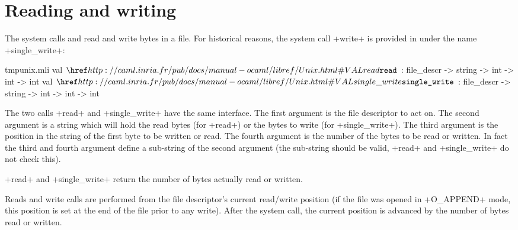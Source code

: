 \section{Reading and writing}

The system calls  and  read and write
bytes in a file. For historical reasons, the system
call \ml+write+ is provided in {\ocaml} under the name
\ml+single_write+:
%
\begin{listingcodefile}{tmpunix.mli}
val $\libvalue{Unix}{read}$  : file_descr -> string -> int -> int -> int
val $\libvalue{Unix}{single\_write}$ : file_descr -> string -> int -> int -> int
\end{listingcodefile}
% 
The two calls \ml+read+ and \ml+single_write+ have the same
interface. The first argument is the file descriptor to act on.  The
second argument is a string which will hold the read bytes (for
\ml+read+) or the bytes to write (for \ml+single_write+). The third
argument is the position in the string of the first byte to be written
or read. The fourth argument is the number of the bytes to be read or
written. In fact the third and fourth argument define a sub-string of
the second argument (the sub-string should be valid, \ml+read+ and
\ml+single_write+ do not check this).
%
\begin{myimage}[width="85\%"]
\end{myimage}
%
\ml+read+ and \ml+single_write+ return the number of bytes actually
read or written.

Reads and write calls are performed from the file descriptor's current
read/write position (if the file was opened in \ml+O_APPEND+ mode,
this position is set at the end of the file prior to any
write). After the system call, the current position is advanced by
the number of bytes read or written.

